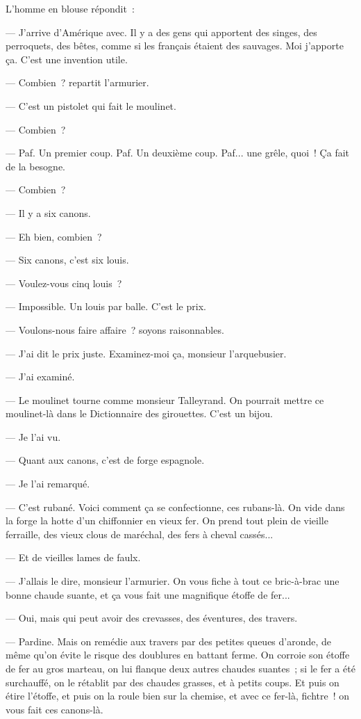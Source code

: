 \documentclass[french,twoside]{book} %
\begin{document}
L’homme en blouse répondit :\par
— J’arrive d’Amérique avec. Il y a des gens qui apportent des singes, des perroquets, des bêtes, comme si les français étaient des sauvages. Moi j’apporte ça. C’est une invention utile.\par
— Combien ? repartit l’armurier.\par
— C’est un pistolet qui fait le moulinet.\par
— Combien ?\par
— Paf. Un premier coup. Paf. Un deuxième coup. Paf... une grêle, quoi ! Ça fait de la besogne.\par
— Combien ?\par
— Il y a six canons.\par
 — Eh bien, combien ?\par
— Six canons, c’est six louis.\par
— Voulez-vous cinq louis ?\par
— Impossible. Un louis par balle. C’est le prix.\par
— Voulons-nous faire affaire ? soyons raisonnables.\par
— J’ai dit le prix juste. Examinez-moi ça, monsieur l’arquebusier.\par
— J’ai examiné.\par
— Le moulinet tourne comme monsieur Talleyrand. On pourrait mettre ce moulinet-là dans le Dictionnaire des girouettes. C’est un bijou.\par
— Je l’ai vu.\par
— Quant aux canons, c’est de forge espagnole.\par
— Je l’ai remarqué.\par
— C’est rubané. Voici comment ça se confectionne, ces rubans-là. On vide dans la forge la hotte d’un chiffonnier en vieux fer. On prend tout plein de vieille ferraille, des vieux clous de maréchal, des fers à cheval cassés...\par
— Et de vieilles lames de faulx.\par
— J’allais le dire, monsieur l’armurier. On vous fiche à tout ce bric-à-brac une bonne chaude suante, et ça vous fait une magnifique étoffe de fer...\par
— Oui, mais qui peut avoir des crevasses, des éventures, des travers.\par
— Pardine. Mais on remédie aux travers par des petites queues d’aronde, de même qu’on évite le risque des doublures en battant ferme. On corroie son étoffe de fer au gros marteau, on lui flanque deux autres chaudes suantes ; si le fer a été surchauffé, on le  rétablit par des chaudes grasses, et à petits coups. Et puis on étire l’étoffe, et puis on la roule bien sur la chemise, et avec ce fer-là, fichtre ! on vous fait ces canons-là.\par
\end{document}
